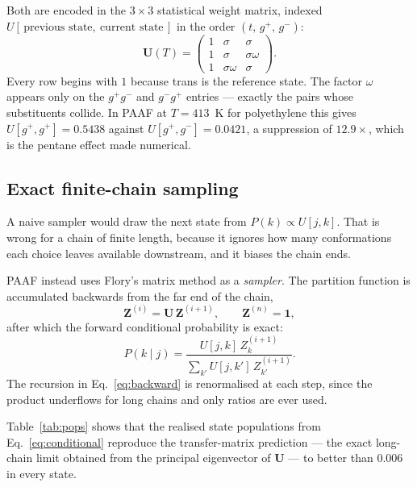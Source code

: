 \documentclass[11pt,a4paper]{article}
\begin{document}
Both are encoded in the $3\times3$ statistical weight matrix, indexed
$U[\,\text{previous state},\ \text{current state}\,]$ in the order
$(t,\, g^{+},\, g^{-})$:
\begin{equation}
  \mathbf{U}(T) =
  \begin{pmatrix}
    1 & \sigma & \sigma \\
    1 & \sigma & \sigma\omega \\
    1 & \sigma\omega & \sigma
  \end{pmatrix}.
  \label{eq:umatrix}
\end{equation}
Every row begins with $1$ because trans is the reference state. The factor
$\omega$ appears only on the $g^{+}g^{-}$ and $g^{-}g^{+}$ entries --- exactly
the pairs whose substituents collide. In PAAF at $T = 413$~K for
polyethylene this gives $U[g^{+},g^{+}] = 0.5438$ against
$U[g^{+},g^{-}] = 0.0421$, a suppression of $12.9\times$, which is the pentane
effect made numerical.

\subsection{Exact finite-chain sampling}

A naive sampler would draw the next state from $P(k) \propto U[j,k]$. That is
wrong for a chain of finite length, because it ignores how many conformations
each choice leaves available downstream, and it biases the chain ends.

PAAF instead uses Flory's matrix method as a \emph{sampler}. The partition
function is accumulated backwards from the far end of the chain,
\begin{equation}
  \mathbf{Z}^{(i)} = \mathbf{U}\,\mathbf{Z}^{(i+1)},
  \qquad \mathbf{Z}^{(n)} = \mathbf{1},
  \label{eq:backward}
\end{equation}
after which the forward conditional probability is exact:
\begin{equation}
  P(k \mid j) =
  \frac{U[j,k]\, Z^{(i+1)}_{k}}
       {\sum_{k'} U[j,k']\, Z^{(i+1)}_{k'}} .
  \label{eq:conditional}
\end{equation}
The recursion in Eq.~\eqref{eq:backward} is renormalised at each step, since
the product underflows for long chains and only ratios are ever used.

Table~\ref{tab:pops} shows that the realised state populations from
Eq.~\eqref{eq:conditional} reproduce the transfer-matrix prediction --- the
exact long-chain limit obtained from the principal eigenvector of
$\mathbf{U}$ --- to better than $0.006$ in every state.
\end{document}

